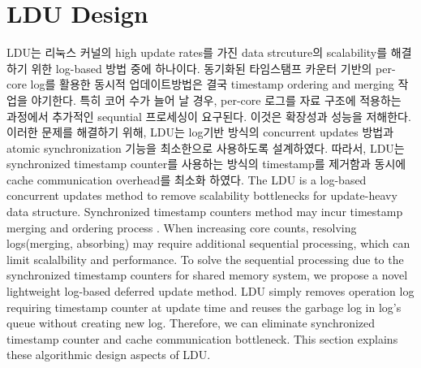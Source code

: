 \section{LDU Design}


\ifkor
LDU는 리눅스 커널의 high update rates를 가진 data strcuture의 scalability를
해결하기 위한 log-based 방법 중에 하나이다.
동기화된 타임스탬프 카운터 기반의 per-core log를 활용한 동시적 업데이트방법은 결국 timestamp ordering and
merging 작업을 야기한다.
특히 코어 수가 늘어 날 경우, per-core 로그를 자료 구조에 적용하는 과정에서 추가적인 sequntial 프로세싱이 요구된다.
이것은 확장성과 성능을 저해한다. 
이러한 문제를 해결하기 위해, LDU는 log기반 방식의 concurrent updates 방법과 atomic synchronization
기능을 최소한으로 사용하도록 설계하였다.
따라서, LDU는 synchronized timestamp counter를 사용하는 방식의 timestamp를 제거함과 동시에 cache
communication overhead를 최소화 하였다.
\else
The LDU is a log-based concurrent updates method to remove scalability
bottlenecks for update-heavy data structure.
Synchronized timestamp counters method may incur timestamp merging and
ordering process .
When increasing core counts, resolving logs(merging, absorbing) may require
additional sequential processing, which can limit scalalbility and performance.
To solve the sequential processing due to the synchronized timestamp counters
for shared memory system, we propose a novel lightweight log-based deferred
update method.
LDU simply removes operation log requiring timestamp counter at update time and
reuses the garbage log in log's queue without creating new log.
Therefore, we can eliminate synchronized timestamp counter and cache
communication bottleneck.
This section explains these algorithmic design aspects of LDU.
\fi



